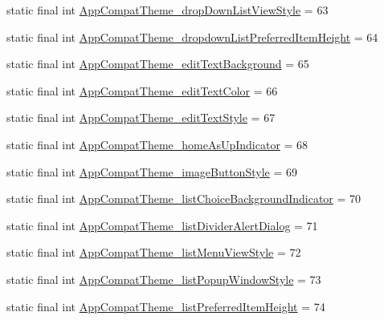 \begin{DoxyCompactItemize}
\item 
static final int \mbox{\hyperlink{classandroid_1_1support_1_1design_1_1_r_1_1styleable_a0924441ed7135e3db2cec46e35e51e9f}{App\+Compat\+Theme\+\_\+drop\+Down\+List\+View\+Style}} = 63
\item 
static final int \mbox{\hyperlink{classandroid_1_1support_1_1design_1_1_r_1_1styleable_ad119a430cc436566a41fc97a2f07cc61}{App\+Compat\+Theme\+\_\+dropdown\+List\+Preferred\+Item\+Height}} = 64
\item 
static final int \mbox{\hyperlink{classandroid_1_1support_1_1design_1_1_r_1_1styleable_ad24ffe9eb7281bd63037797afdce253c}{App\+Compat\+Theme\+\_\+edit\+Text\+Background}} = 65
\item 
static final int \mbox{\hyperlink{classandroid_1_1support_1_1design_1_1_r_1_1styleable_ab486979dc06f79e409db764cfa4aa29e}{App\+Compat\+Theme\+\_\+edit\+Text\+Color}} = 66
\item 
static final int \mbox{\hyperlink{classandroid_1_1support_1_1design_1_1_r_1_1styleable_aac38861978f6e746a3be9be15cf55efa}{App\+Compat\+Theme\+\_\+edit\+Text\+Style}} = 67
\item 
static final int \mbox{\hyperlink{classandroid_1_1support_1_1design_1_1_r_1_1styleable_a95fb0fff5acb797bd9aa3d3064104a16}{App\+Compat\+Theme\+\_\+home\+As\+Up\+Indicator}} = 68
\item 
static final int \mbox{\hyperlink{classandroid_1_1support_1_1design_1_1_r_1_1styleable_a4794f3aac674ee35d96ccb6bb74ae9ef}{App\+Compat\+Theme\+\_\+image\+Button\+Style}} = 69
\item 
static final int \mbox{\hyperlink{classandroid_1_1support_1_1design_1_1_r_1_1styleable_af558e7fde0f25bbd6024a20fc56f2dc9}{App\+Compat\+Theme\+\_\+list\+Choice\+Background\+Indicator}} = 70
\item 
static final int \mbox{\hyperlink{classandroid_1_1support_1_1design_1_1_r_1_1styleable_a9b01db2a8507ac5a0afcc23f6557d38b}{App\+Compat\+Theme\+\_\+list\+Divider\+Alert\+Dialog}} = 71
\item 
static final int \mbox{\hyperlink{classandroid_1_1support_1_1design_1_1_r_1_1styleable_a3d0a5aca2aa5430052b66cc0043e56ef}{App\+Compat\+Theme\+\_\+list\+Menu\+View\+Style}} = 72
\item 
static final int \mbox{\hyperlink{classandroid_1_1support_1_1design_1_1_r_1_1styleable_ab74bedd716669bdc046b074404569c00}{App\+Compat\+Theme\+\_\+list\+Popup\+Window\+Style}} = 73
\item 
static final int \mbox{\hyperlink{classandroid_1_1support_1_1design_1_1_r_1_1styleable_ae51b238e15b18ba621c6154e12d56cee}{App\+Compat\+Theme\+\_\+list\+Preferred\+Item\+Height}} = 74

\end{DoxyCompactItemize}
